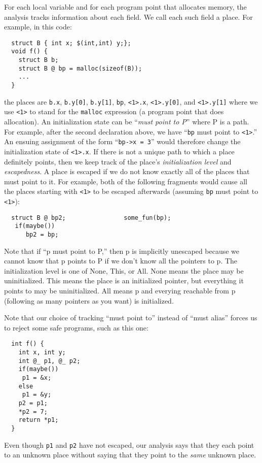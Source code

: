 For each local variable and for each program point that allocates
memory, the analysis tracks information about each field.  We call
each such field a place. For example, in this code:
\begin{verbatim}
  struct B { int x; $(int,int) y;}; 
  void f() {
    struct B b;
    struct B @ bp = malloc(sizeof(B));
    ...
  }
\end{verbatim}
the places are \texttt{b.x}, \texttt{b.y[0]}, \texttt{b.y[1]}, \texttt{bp},
\texttt{<1>.x}, \texttt{<1>.y[0]}, and \texttt{<1>.y[1]} where we use
\texttt{<1>} to stand for the \texttt{malloc} expression (a program point
that does allocation).  An initialization state can be ``\emph{must
  point to P}'' where P is a path.  For example, after the second
declaration above, we have ``\texttt{bp} must point to \texttt{<1>}.''  An
ensuing assignment of the form ``\texttt{bp->x = 3}'' would therefore
change the initialization state of \texttt{<1>.x}.  If there is not a
unique path to which a place definitely points, then we keep track of
the place's \emph{initialization level} and \emph{escapedness}.  A
place is escaped if we do not know exactly all of the places that must
point to it.  For example, both of the following fragments would cause
all the places starting with \texttt{<1>} to be escaped afterwards
(assuming \texttt{bp} must point to \texttt{<1>}):
\begin{verbatim}
  struct B @ bp2;                some_fun(bp);                      
   if(maybe()) 
      bp2 = bp;
\end{verbatim}

Note that if ``p must point to P,'' then p is implicitly unescaped
because we cannot know that p points to P if we don't know all the
pointers to p.  The initialization level is one of None, This, or All.
None means the place may be uninitialized.  This means the place is an
initialized pointer, but everything it points to may be uninitialized.
All means p and everying reachable from p (following as many pointers
as you want) is initialized.

Note that our choice of tracking ``must point to'' instead of ``must
alias'' forces us to reject some safe programs, such as this one:
\begin{verbatim}
  int f() {
    int x, int y;
    int @_ p1, @_ p2;
    if(maybe())
     p1 = &x;
    else
     p1 = &y;
    p2 = p1;
    *p2 = 7;
    return *p1;
  }
\end{verbatim}

Even though \texttt{p1} and \texttt{p2} have not escaped, our analysis
says that they each point to an unknown place without saying that they
point to the \emph{same} unknown place.

